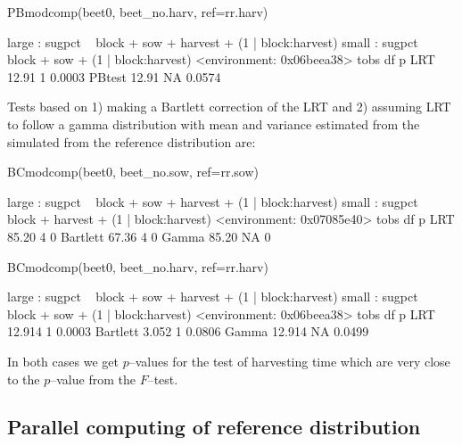 \documentclass[12pt]{article}
\begin{document}
\begin{Schunk}
\begin{Sinput}
 PBmodcomp(beet0, beet_no.harv, ref=rr.harv)
\end{Sinput}
\begin{Soutput}
large : sugpct ~ block + sow + harvest + (1 | block:harvest)
small : sugpct ~ block + sow + (1 | block:harvest)
<environment: 0x06beea38>
        tobs df      p
LRT    12.91  1 0.0003
PBtest 12.91 NA 0.0574
\end{Soutput}
\end{Schunk}



Tests based on 1) making a Bartlett correction of the LRT and 2)
assuming LRT to follow a gamma distribution with mean and variance
estimated from the
simulated from the reference distribution are:



\begin{Schunk}
\begin{Sinput}
 BCmodcomp(beet0, beet_no.sow, ref=rr.sow)
\end{Sinput}
\begin{Soutput}
large : sugpct ~ block + sow + harvest + (1 | block:harvest)
small : sugpct ~ block + harvest + (1 | block:harvest)
<environment: 0x07085e40>
          tobs df p
LRT      85.20  4 0
Bartlett 67.36  4 0
Gamma    85.20 NA 0
\end{Soutput}
\end{Schunk}


\begin{Schunk}
\begin{Sinput}
 BCmodcomp(beet0, beet_no.harv, ref=rr.harv)
\end{Sinput}
\begin{Soutput}
large : sugpct ~ block + sow + harvest + (1 | block:harvest)
small : sugpct ~ block + sow + (1 | block:harvest)
<environment: 0x06beea38>
           tobs df      p
LRT      12.914  1 0.0003
Bartlett  3.052  1 0.0806
Gamma    12.914 NA 0.0499
\end{Soutput}
\end{Schunk}

In both cases we get $p$--values for the test of harvesting time which
are very close to the $p$--value from the $F$--test.


\subsection{Parallel computing of reference distribution}
\label{sec:parall-comp-refer}
\end{document}
